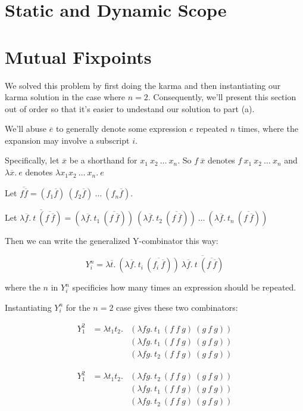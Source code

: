 \documentclass[10pt]{article}
\begin{document}
\section{Static and Dynamic Scope}%
\section{Mutual Fixpoints}%
We solved this problem by first doing the karma and then instantiating our
karma solution in the case where $n = 2$. Consequently, we'll present this
section out of order so that it's easier to undestand our solution to part (a).

We'll abuse $\overline{e}$ to generally denote some expression $e$ repeated $n$
times, where the expansion may involve a subscript $i$.

Specifically, let $\overline{x}$ be a shorthand for $x_1~x_2~\ldots~x_n$. So $f~\overline{x}$
denotes $f~x_1~x_2~\ldots~x_n$ and $\lambda \overline{x}.~e$ denotes $\lambda x_1 x_2~\ldots~x_n.~e$

Let $\overline{{f \overline{f}}} = (f_1 \overline{f})~(f_2 \overline{f})~\ldots~(f_n \overline{f})$.

Let $\overline{\lambda \overline{f}.~t~(\overline{f~\overline{f}})}
= (\lambda \overline{f}.~t_1~(\overline{f~\overline{f}}))
  ~(\lambda \overline{f}.~t_2~(\overline{f~\overline{f}}))
  ~\ldots
  ~(\lambda \overline{f}.~t_n~(\overline{f~\overline{f}}))$

Then we can write the generalized Y-combinator this way:

$$Y^n_i= \lambda \overline{t}.
    ~(\lambda \overline{f}.~t_i~(\overline{f_i~\overline{f}}))
    ~\overline{\lambda \overline{f}.~t~(\overline{f~\overline{f}})} $$

where the $n$ in $Y^n_i$ specificies how many times an expression should be
repeated.

Instantiating $Y^n_i$ for the $n = 2$ case gives these two combinators:

\begin{eqnarray*}
    Y^2_1 & = \lambda t_1 t_2 . & (\lambda f g.~t_1~(f~f~g)~(g~f~g)) \\
          &                     & (\lambda f g.~t_1~(f~f~g)~(g~f~g)) \\
          &                     & (\lambda f g.~t_2~(f~f~g)~(g~f~g))
\end{eqnarray*}

\begin{eqnarray*}
    Y^2_1 & = \lambda t_1 t_2 . & (\lambda f g .~t_2~(f~f~g)~(g~f~g)) \\
          &                     & (\lambda f g .~t_1~(f~f~g)~(g~f~g)) \\
          &                     & (\lambda f g .~t_2~(f~f~g)~(g~f~g))
\end{eqnarray*}
\end{document}
